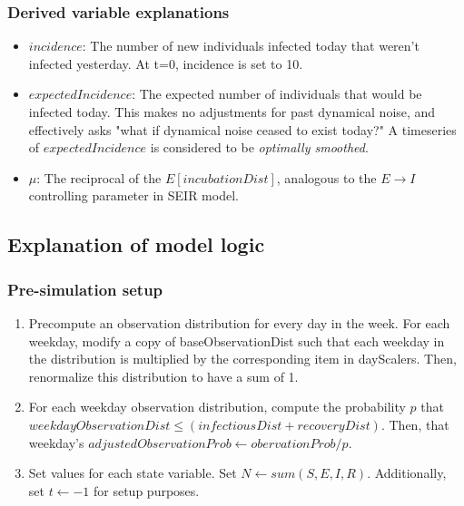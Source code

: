 \documentclass{article}
\begin{document}
\subsubsection{Derived variable explanations}
\begin{itemize}
    \item $incidence$: The number of new individuals infected today that weren't infected yesterday. At t=0, incidence is set to 10.
    \item $expectedIncidence$: The expected number of individuals that would be infected today. This makes no adjustments for past dynamical noise, and effectively asks "what if dynamical noise ceased to exist today?" A timeseries of $expectedIncidence$ is considered to be \textit{optimally smoothed}.
    \item $\mu$: The reciprocal of the $E[incubationDist]$, analogous to the $E \rightarrow I$ controlling parameter in SEIR model.
\end{itemize}

\subsection{Explanation of model logic}
\subsubsection{Pre-simulation setup}

\begin{enumerate}
    \item Precompute an observation distribution for every day in the week. For each weekday, modify a copy of baseObservationDist such that each weekday in the distribution is multiplied by the corresponding item in dayScalers. Then, renormalize this distribution to have a sum of 1.

    \item For each weekday observation distribution, compute the probability $p$ that $weekdayObservationDist \leq (infectiousDist+recoveryDist)$. Then, that weekday's $adjustedObservationProb \gets obervationProb/p$. 
    
    \item Set values for each state variable. Set $N \gets sum(S, E, I, R)$. Additionally, set $t \gets -1$ for setup purposes.

\end{enumerate}
\end{document}
